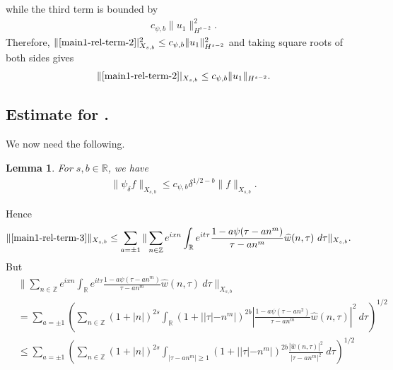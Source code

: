 \documentclass[12pt,reqno]{amsart}
\numberwithin{equation}{section}  %
\renewcommand{\cref}{\Cref}
\newcommand{\rr}{\mathbb{R}}
\newcommand{\zz}{\mathbb{Z}}
\newcommand{\wh}{\widehat}
\newtheorem{lemma}[theorem]{Lemma}
\begin{document}
while the third term is bounded by  
%
%
\begin{equation*}
\begin{split}
  c_{\psi,b}  \| u_{1} \|_{H^{s-2}}^{2}.
\end{split}
\end{equation*}
%
%
Therefore, 
$\|\cref{main1-rel-term-2}|_{X_{s,b}}^{2} \le c_{\psi,b} 
\|u_{1}\|_{H^{s-2}}^2$ and
taking square roots of both sides gives
%
%
\begin{equation}
  \label{u-1-est}
  \begin{split}
    \|\cref{main1-rel-term-2}|_{X_{s,b}} \le c_{\psi,b} 
    \|u_{1}\|_{H^{s-2}}.
  \end{split}
\end{equation}
%
%
%
%
\subsection{Estimate for \cref{main1-rel-term-3}.}
%
%
%
%
%
%
%
%
%
We now need the following.
%
\begin{lemma}
\label{lem:schwartz-mult}
For $s, b \in \rr$, we have
%
%
\begin{equation}
	\label{schwartz-mult}
	\begin{split}
    \|\psi_{\delta} f \|_{X_{s,b}} \le c_{\psi, b} \delta^{1/2-b} \|f \|_{X_{s,b}}.
	\end{split}
\end{equation}
%
%
\end{lemma}
%
Hence
%
%
\begin{equation}
  \label{yu}
	\begin{split}
		\|\cref{main1-rel-term-3}\|_{X_{s,b}} 
    & \le 
    \sum_{a = \pm 1} \| \sum_{n \in \zz}  e^{ixn} \int_\rr 
		e^{it \tau} \frac{1 - a\psi (\tau - an^{m} ) 
}{\tau - an^{m}} \wh{w}(n, \tau) \ 
		d \tau\|_{X_{s,b}}.
			\end{split}
\end{equation}
%
But
%
%
\begin{equation}
\label{main-int2-est-X-s-part}
\begin{split}
  & \| \sum_{n \in \zz} e^{ixn} \int_\rr 
		e^{it \tau} \frac{1 - a\psi (\tau - an^{m} ) 
  }{\tau - an^{m}} \wh{w}(n, \tau) \ 
		d \tau\|_{X_{s,b}}
		\\
    & = \sum_{a = \pm 1}\left( \sum_{n \in \zz} \left (1 + |n| \right )^{2s} \int_\rr
    (1 + |  |\tau| - n^{m}|)^{2b} \left | \frac{1 - a\psi(\tau - an^{2 
})}{\tau - an^{m}} 
     \wh{w}(n, \tau) \right |^2 \ d 
		\tau \right)^{1/2}
		\\
    & \le \sum_{a = \pm 1}
    \left( \sum_{n \in \zz} \left (1 + |n| \right )^{2s} \int_{| \tau - an^{m}| \ge 1}
    (1 + | |\tau| - n^{m}|)^{2b} \frac{|  \wh{w}(n, \tau)|^2}{|\tau - an^{m}|^2} 
		\ d 
		\tau \right)^{1/2}
  \end{split}
\end{equation}
\end{document}
